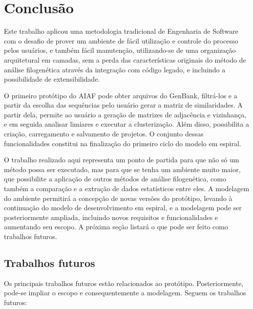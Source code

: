 \chapter{Conclusão} \label{cap:conclusao}

Este trabalho
aplicou uma metodologia tradicional de Engenharia de Software com o desafio de prover um ambiente de fácil utilização e controle do processo pelos usuários,
e também fácil manutenção, utilizando-se de uma organização arquitetural em camadas, sem a perda das características originais do método de análise
filogenética através da integração com código legado, e incluindo a possibilidade de extensibilidade.

O primeiro protótipo do AIAF pode obter arquivos do GenBank, filtrá-los e a partir da escolha das sequências pelo usuário gerar a matriz de similaridades.
A partir dela, permite ao usuário a geração de matrizes de adjacência e vizinhança, e em seguida analisar limiares e executar a clusterização.
Além disso, possibilita a criação, carregamento e salvamento de projetos. O conjunto dessas funcionalidades
constitui na finalização do primeiro ciclo do modelo em espiral.

O trabalho realizado aqui representa um ponto de partida para que não só um método possa ser executado, mas para que se tenha um ambiente muito maior, que
possibilite a aplicação de outros métodos de análise filogenética, como também a comparação e a extração de dados estatísticos entre eles. A modelagem do
ambiente permitirá a concepção de novas versões do protótipo, levando à continuação do modelo de desenvolvimento em espiral, e a modelagem pode
ser posteriormente ampliada, incluindo novos requisitos e funcionalidades e aumentando seu escopo. A próxima seção listará o que pode ser feito como trabalhos
futuros.

\section{Trabalhos futuros}

Os principais trabalhos futuros estão relacionados ao protótipo. Posteriormente, pode-se impliar o escopo e consequentemente a modelagem. Seguem os trabalhos
futuros:


